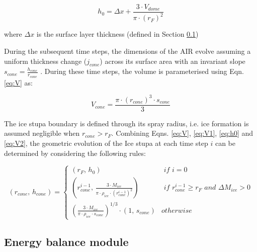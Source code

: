 \begin{equation}
	h_{0} =  \Delta x + \frac{3 \cdot V_{dome}}{\pi \cdot (r_F)^2 }
	\label{eq:h0}
\end{equation}

where $\Delta x$ is the surface layer thickness (defined in Section \ref{sec:energy})

During the subsequent time steps, the dimensions of the AIR evolve assuming a uniform thickness change ($j_{cone}$)
across its surface area with an invariant slope $s_{cone} = \frac{h_{cone}}{r_{cone}}$ .  During these time
steps, the volume is parameterised using Eqn. \ref{eq:V} as:

\begin{equation} 
  V_{cone} = \frac{\pi \cdot {(r_{cone})}^3 \cdot s_{cone}}{3} 
\label{eq:V2} 
\end{equation}

The ice stupa boundary is defined through its spray radius, i.e. ice formation is assumed negligible when
$r_{cone} > r_{F}$. Combining Eqns. \ref{eq:V},  \ref{eq:V1}, \ref{eq:h0} and \ref{eq:V2}, the geometric
evolution of the Ice stupa at each time step $i$ can be determined by considering the following rules:

\begin{equation} (r_{cone},\, h_{cone}) = \left\{ \begin{array}{ll} (r_F ,\, h_0)                                                                          & \textit{ if } i=0 \\
             (r_{cone}^{i-1},\, \frac{3 \cdot M_{ice}}{\pi \cdot \rho_{ice} \cdot {(r_{cone}^{i-1})}^2}) & \textit{ if }
             r_{cone}^{i-1} \geq r_{F} \textit{ and } \Delta M_{ice} > 0                                                     \\ (\frac{3 \cdot M_{ice}}{\pi \cdot \rho_{ice} \cdot s_{cone}})^{1/3} \cdot (1,\,  s_{cone}) &
             otherwise\end{array} \right.  \label{eq:A2} \end{equation}

\subsection{Energy balance module} \label{sec:energy}

